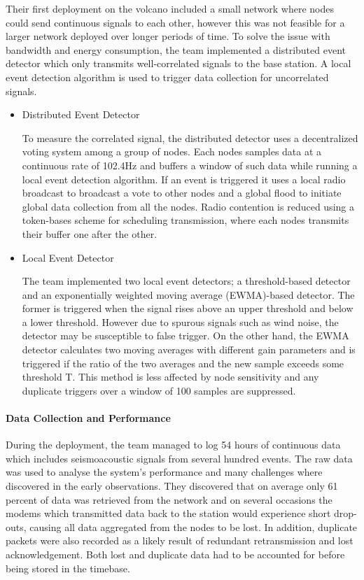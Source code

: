 Their first deployment on the volcano included a small network where nodes could send continuous signals to each other, however this was not feasible for a larger network deployed over longer periods of time. To solve the issue with bandwidth and energy consumption, the team implemented a distributed event detector which only transmits well-correlated signals to the base station. A local event detection algorithm is used to trigger data collection for uncorrelated signals.

\begin{itemize}
\item Distributed Event Detector

To measure the correlated signal, the distributed detector uses a decentralized voting system among a group of nodes. Each nodes samples data at a continuous rate of 102.4Hz and buffers a window of such data while running a local event detection algorithm. If an event is triggered it uses a local radio broadcast to broadcast a vote to other nodes and a global flood to initiate global data collection from all the nodes. Radio contention is reduced using a token-bases scheme for scheduling transmission, where each nodes transmits their buffer one after the other. 

\item Local Event Detector

The team implemented two local event detectors; a threshold-based detector and an exponentially weighted moving average (EWMA)-based detector. The former is triggered when the signal rises above an upper threshold and below a lower threshold. However due to spurous signals such as wind noise, the detector may be susceptible to false trigger. On the other hand, the EWMA detector calculates two moving averages with different gain parameters and is triggered if the ratio of the two averages and the new sample exceeds some threshold T. This method is less affected by node sensitivity and any duplicate triggers over a window of 100 samples are suppressed.
\end{itemize}

\paragraph{Data Collection and Performance}

During the deployment, the team managed to log 54 hours of continuous data which includes seismoacoustic signals from several hundred events. The raw data was used to analyse the system's performance and many challenges where discovered in the early observations. They discovered that on average only 61 percent of data was retrieved from the network and on several occasions the modems which transmitted data back to the station would experience short drop-outs, causing all data aggregated from the nodes to be lost. In addition, duplicate packets were also recorded as a likely result of redundant retransmission and lost acknowledgement. Both lost and duplicate data had to be accounted for before being stored in the timebase.

